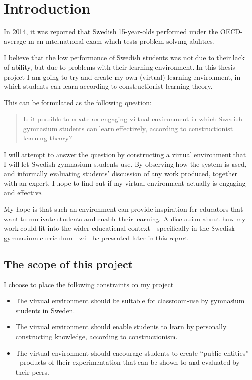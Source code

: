 \chapter{Introduction}

In 2014, it was reported that Swedish 15-year-olds performed under the OECD-average in an international exam which tests problem-solving abilities\cite{skolverket:pisa}.

I believe that the low performance of Swedish students was not due to their lack of ability, but due to problems with their learning environment. In this thesis project I am going to try and create my own (virtual) learning environment, in which students can learn according to constructionist learning theory.

This can be formulated as the following question:
\begin{quote}
Is it possible to create an engaging virtual environment in which Swedish gymnasium students can learn effectively, according to constructionist learning theory?
\end{quote}

I will attempt to answer the question by constructing a virtual environment that I will let Swedish gymnasium students use. By observing how the system is used, and informally evaluating students' discussion of any work produced, together with an expert, I hope to find out if my virtual environment actually is engaging and effective.

My hope is that such an environment can provide inspiration for educators that want to motivate students and enable their learning. A discussion about how my work could fit into the wider educational context - specifically in the Swedish gymnasium curriculum - will be presented later in this report.

\section{The scope of this project}

I choose to place the following constraints on my project:
\begin{itemize}
  \item The virtual environment should be suitable for classroom-use by gymnasium students in Sweden.
  \item The virtual environment should enable students to learn by personally constructing knowledge, according to constructionism.
  \item The virtual environment should encourage students to create ``public entities'' - products of their experimentation that can be shown to and evaluated by their peers.
\end{itemize}
